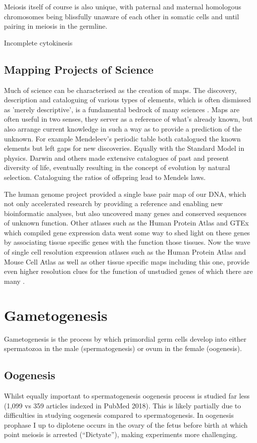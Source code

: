 Meiosis itself of course is also unique, with paternal and maternal homologous chromosomes being blissfully unaware of each other in somatic cells and until pairing in meiosis in the germline.

Incomplete cytokinesis


\subsection{Mapping Projects of Science}

Much of science can be characterised as the creation of maps. The discovery, description and cataloguing of various types of elements, which is often dismissed as 'merely descriptive', is a fundamental bedrock of many sciences \cite{Grimaldi2007Why}. Maps are often useful in two senses, they server as a reference of what's already known, but also arrange current knowledge in such a way as to provide a prediction of the unknown. For example Mendeleev's periodic table both catalogued the known elements but left gaps for new discoveries. Equally with the Standard Model in physics. Darwin and others made extensive catalogues of past and present diversity of life, eventually resulting in the concept of evolution by natural selection. Cataloguing the ratios of offspring lead to Mendels laws.

The human genome project provided a single base pair map of our DNA, which not only accelerated research by providing a reference and enabling new bioinformatic analyses, but also uncovered many genes and conserved sequences of unknown function. Other atlases such as the Human Protein Atlas and GTEx which compiled gene expression data went some way to shed light on these genes by associating tissue specific genes with the function those tissues. Now the wave of single cell resolution expression atlases such as the Human Protein Atlas and Mouse Cell Atlas as well as other tissue specific maps including this one, provide even higher resolution clues for the function of unstudied genes of which there are many \parencite{X}.




\section{Gametogenesis}
Gametogenesis is the process by which primordial germ cells develop into either spermatozoa in the male (spermatogenesis) or ovum in the female (oogenesis).

\subsection{Oogenesis}
Whilst equally important to spermatogenesis oogenesis process is studied far less (1,099 vs 359 articles indexed in PubMed 2018). This is likely partially due to difficulties in studying oogenesis compared to spermatogenesis. In oogenesis prophase I up to diplotene occurs in the ovary of the fetus before birth at which point meiosis is arrested (``Dictyate''), making experiments more challenging.

